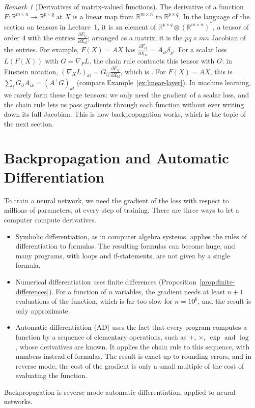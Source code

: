 \documentclass[11pt]{article}
\newcommand{\py}[1]{\texttt{\detokenize{#1}}}
\theoremstyle{definition}
\theoremstyle{plain}
\theoremstyle{remark}
\newtheorem{remark}[definition]{Remark}
\begin{document}
\begin{remark}[Derivatives of matrix-valued functions]
    The derivative of a function $F: \mathbb{R}^{m \times n} \to \mathbb{R}^{p \times q}$ at $X$ is a linear map from $\mathbb{R}^{m \times n}$ to $\mathbb{R}^{p \times q}$. In the language of the section on tensors in Lecture~1, it is an element of $\mathbb{R}^{p \times q} \otimes (\mathbb{R}^{m \times n})^*$, a tensor of order $4$ with the entries $\frac{\partial F_{ij}}{\partial X_{kl}}$; arranged as a matrix, it is the $pq \times mn$ Jacobian of the entries. For example, $F(X) = AX$ has $\frac{\partial F_{ij}}{\partial X_{kl}} = A_{ik}\delta_{jl}$. For a scalar loss $L(F(X))$ with $G = \nabla_F L$, the chain rule contracts this tensor with $G$: in Einstein notation, $(\nabla_X L)_{kl} = G_{ij}\frac{\partial F_{ij}}{\partial X_{kl}}$, which is \py{np.einsum("ij,ijkl->kl", G, DF)}. For $F(X) = AX$, this is $\sum_i G_{il}A_{ik} = (A^\top G)_{kl}$ (compare Example~\ref{ex:linear-layer}). In machine learning, we rarely form these large tensors: we only need the gradient of a scalar loss, and the chain rule lets us pass gradients through each function without ever writing down its full Jacobian. This is how backpropagation works, which is the topic of the next section.
\end{remark}

\section{Backpropagation and Automatic Differentiation}\label{sec:autodiff}

To train a neural network, we need the gradient of the loss with respect to millions of parameters, at every step of training. There are three ways to let a computer compute derivatives.
\begin{itemize}
    \item Symbolic differentiation, as in computer algebra systems, applies the rules of differentiation to formulas. The resulting formulas can become huge, and many programs, with loops and if-statements, are not given by a single formula.
    \item Numerical differentiation uses finite differences (Proposition~\ref{prop:finite-differences}). For a function of $n$ variables, the gradient needs at least $n + 1$ evaluations of the function, which is far too slow for $n = 10^6$, and the result is only approximate.
    \item Automatic differentiation (AD) uses the fact that every program computes a function by a sequence of elementary operations, such as $+$, $\times$, $\exp$ and $\log$, whose derivatives are known. It applies the chain rule to this sequence, with numbers instead of formulas. The result is exact up to rounding errors, and in reverse mode, the cost of the gradient is only a small multiple of the cost of evaluating the function.
\end{itemize}
Backpropagation is reverse-mode automatic differentiation, applied to neural networks.
\end{document}
